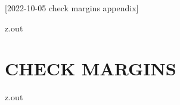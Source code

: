 [2022-10-05 check margins appendix]

\begin{VerbatimOut}{z.out}
\chapter{CHECK MARGINS}
\end{VerbatimOut}

\MyIO


\begin{VerbatimOut}{z.out}
\end{VerbatimOut}

\MyIO
